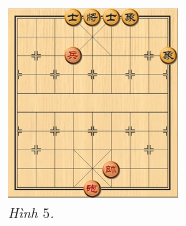 \begin{multicols}{2}
\begin{figure}[H]
		\centering
		\captionsetup{labelformat= empty, justification=centering}
		\includegraphics[width= 0.4\textwidth]{5}
		\caption{\small\textit{\color{gocco}Hình $5$.}}
		\vspace*{-5pt}
	\end{figure}
\end{multicols}




